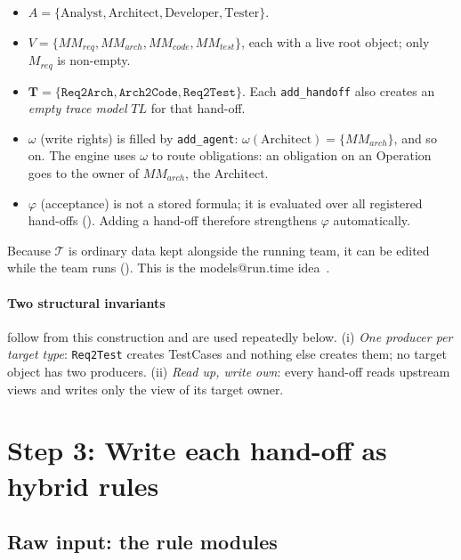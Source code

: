 \documentclass[10pt,a4paper]{article}
\newcommand{\MM}{\mathit{MM}}
\newcommand{\TL}{\mathit{TL}}
\newcommand{\team}{\mathcal{T}}
\newcommand{\cls}[1]{\textsf{#1}}
\newcommand{\code}[1]{\texttt{#1}}
\theoremstyle{definition}
\begin{document}
\begin{itemize}[nosep]
\item $A=\{\text{Analyst},\text{Architect},\text{Developer},\text{Tester}\}$.
\item $V=\{\MM_{\mathit{req}},\MM_{\mathit{arch}},\MM_{\mathit{code}},\MM_{\mathit{test}}\}$,
each with a live root object; only $M_{\mathit{req}}$ is non-empty.
\item $\mathbf{T}=\{\code{Req2Arch},\code{Arch2Code},\code{Req2Test}\}$. Each
\code{add_handoff} also creates an \emph{empty trace model}
$\TL$ for that hand-off.
\item $\omega$ (write rights) is filled by \code{add_agent}:
$\omega(\text{Architect})=\{\MM_{\mathit{arch}}\}$, and so on. The engine
uses $\omega$ to route obligations: an obligation on an \cls{Operation} goes
to the owner of $\MM_{\mathit{arch}}$, the Architect.
\item $\varphi$ (acceptance) is not a stored formula; it is evaluated over
all registered hand-offs (). Adding a hand-off therefore
strengthens $\varphi$ automatically.
\end{itemize}

Because $\team$ is ordinary data kept alongside the running team, it can be
edited while the team runs (). This is the models@run.time
idea~\cite{blair2009runtime}.

\paragraph{Two structural invariants} follow from this construction and are
used repeatedly below. (i) \emph{One producer per target type}: \code{Req2Test}
creates \cls{TestCase}s and nothing else creates them; no target object has two
producers. (ii) \emph{Read up, write own}: every hand-off reads upstream views
and writes only the view of its target owner.

\section{Step 3: Write each hand-off as hybrid rules}\label{sec:step3}

\subsection{Raw input: the rule modules}
\end{document}
